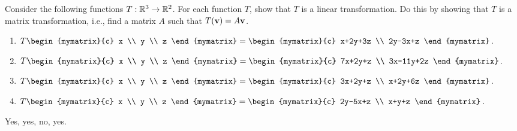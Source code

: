 \begin{ex}
  Consider the following functions $T:\mathbb{R}^{3}\rightarrow \mathbb{R}^{2}$. For
  each function $T$, show that $T$ is a linear transformation. Do this
  by showing that $T$ is a matrix transformation, i.e., find a matrix
  $A$ such that $T(\mbox{\bf v})=A\mbox{\bf v}$.
  \begin{enumerate}
  \item $T\begin{mymatrix}{c} x \\ y \\ z \end{mymatrix}
    = \begin{mymatrix}{c}
      x+2y+3z \\
      2y-3x+z
    \end{mymatrix}$.
  \item $T\begin{mymatrix}{c} x \\ y \\ z \end{mymatrix}
    = \begin{mymatrix}{c}
      7x+2y+z \\
      3x-11y+2z
    \end{mymatrix}$.
  \item $T\begin{mymatrix}{c} x \\ y \\ z \end{mymatrix}
    = \begin{mymatrix}{c}
      3x+2y+z \\
      x+2y+6z
    \end{mymatrix}$.
  \item $T\begin{mymatrix}{c} x \\ y \\ z \end{mymatrix}
    = \begin{mymatrix}{c}
      2y-5x+z \\
      x+y+z
    \end{mymatrix}$.
  \end{enumerate}
  \begin{sol}
    Yes, yes, no, yes.
  \end{sol}
\end{ex}

